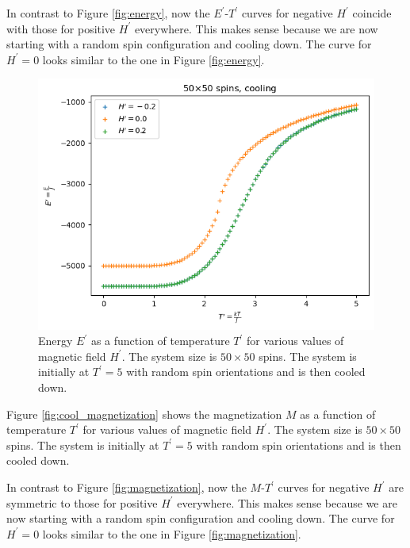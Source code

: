 \documentclass[11pt]{article}
\begin{document}
In contrast to Figure \ref{fig:energy}, now the $E^\prime$-$T^\prime$ curves for negative $H^\prime$ coincide with those for positive $H^\prime$ everywhere. This makes sense because we are now starting with a random spin configuration and cooling down. The curve for $H^\prime = 0$ looks similar to the one in Figure \ref{fig:energy}.
\begin{figure}[H]
    \centering
    \includegraphics[scale = 0.7]{Figs_TW/cool_energy_N50.png}
    \caption{Energy $E^\prime$ as a function of temperature $T^\prime$ for various values of magnetic field $H^\prime$. The system size is $50 \times 50$ spins. The system is initially at $T^\prime = 5$ with random spin orientations and is then cooled down.}
    \label{fig:cool_energy}
\end{figure}

Figure \ref{fig:cool_magnetization} shows the magnetization $M$ as a function of temperature $T^\prime$ for various values of magnetic field $H^\prime$. The system size is $50 \times 50$ spins. The system is initially at $T^\prime = 5$ with random spin orientations and is then cooled down.

In contrast to Figure \ref{fig:magnetization}, now the $M$-$T^\prime$ curves for negative $H^\prime$ are symmetric to those for positive $H^\prime$ everywhere. This makes sense because we are now starting with a random spin configuration and cooling down. The curve for $H^\prime = 0$ looks similar to the one in Figure \ref{fig:magnetization}.
\end{document}
